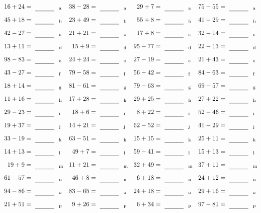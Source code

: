 \documentclass
[
  draft    = true,
  fontsize = 11pt,
  parskip  = half-
]
{scrartcl}
\begin{document}
\clearpage
\begin{align*}
    \pline{16+24}&=\rline{a}
  & \pline{38-28}&=\rline{a}
  & \pline{29+7}&=\rline{a}
  & \pline{75-55}&=\rline{a} \\[1ex]
    \pline{45+18}&=\rline{b}
  & \pline{23+49}&=\rline{b}
  & \pline{55+8}&=\rline{b}
  & \pline{41-29}&=\rline{b} \\[1ex]
    \pline{42-27}&=\rline{c}
  & \pline{21+21}&=\rline{c}
  & \pline{17+8}&=\rline{c}
  & \pline{32-14}&=\rline{c} \\[1ex]
    \pline{13+11}&=\rline{d}
  & \pline{15+9}&=\rline{d}
  & \pline{95-77}&=\rline{d}
  & \pline{22-13}&=\rline{d} \\[1ex]
    \pline{98-83}&=\rline{e}
  & \pline{24+24}&=\rline{e}
  & \pline{27-19}&=\rline{e}
  & \pline{21+43}&=\rline{e} \\[1ex]
    \pline{43-27}&=\rline{f}
  & \pline{79-58}&=\rline{f}
  & \pline{56-42}&=\rline{f}
  & \pline{84-63}&=\rline{f} \\[1ex]
    \pline{18+14}&=\rline{g}
  & \pline{81-61}&=\rline{g}
  & \pline{79-63}&=\rline{g}
  & \pline{69-57}&=\rline{g} \\[1ex]
    \pline{11+16}&=\rline{h}
  & \pline{17+28}&=\rline{h}
  & \pline{29+25}&=\rline{h}
  & \pline{27+22}&=\rline{h} \\[1ex]
    \pline{29-23}&=\rline{i}
  & \pline{18+6}&=\rline{i}
  & \pline{8+22}&=\rline{i}
  & \pline{52-46}&=\rline{i} \\[1ex]
    \pline{19+37}&=\rline{j}
  & \pline{14+21}&=\rline{j}
  & \pline{62-52}&=\rline{j}
  & \pline{41-29}&=\rline{j} \\[1ex]
    \pline{33-19}&=\rline{k}
  & \pline{63-51}&=\rline{k}
  & \pline{15+15}&=\rline{k}
  & \pline{25+11}&=\rline{k} \\[1ex]
    \pline{14+13}&=\rline{l}
  & \pline{49+7}&=\rline{l}
  & \pline{59-41}&=\rline{l}
  & \pline{15+13}&=\rline{l} \\[1ex]
    \pline{19+9}&=\rline{m}
  & \pline{11+21}&=\rline{m}
  & \pline{32+49}&=\rline{m}
  & \pline{37+11}&=\rline{m} \\[1ex]
    \pline{61-57}&=\rline{n}
  & \pline{46+8}&=\rline{n}
  & \pline{6+18}&=\rline{n}
  & \pline{24+12}&=\rline{n} \\[1ex]
    \pline{94-86}&=\rline{o}
  & \pline{83-65}&=\rline{o}
  & \pline{24+18}&=\rline{o}
  & \pline{29+16}&=\rline{o} \\[1ex]
    \pline{21+51}&=\rline{p}
  & \pline{9+26}&=\rline{p}
  & \pline{6+34}&=\rline{p}
  & \pline{97-81}&=\rline{p}
\end{align*}
\end{document}
